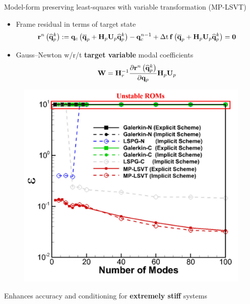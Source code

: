 \documentclass[]{beamer}
\begin{document}
\begin{frame}{\small{Model-form preserving least-squares with variable transformation (MP-LSVT)}}
	\begin{itemize}
		\item Frame residual in terms of target state\footnotemark[6]
		\begin{equation*}
			\resFuncIter{\timeIdx}{\primVecCoef^{\newtonIdx}} \defEq \consFunc{\primVecCent + \primScale \primTrial \primVecCoef^{\newtonIdx}} - \consVec^{\timeIdx-1} + \dt \, \rhsFunc{\primVecCent + \primScale \primTrial \primVecCoef^{\newtonIdx}} = \zeroVec
		\end{equation*}
		\item Gauss--Newton w/r/t \textbf{target variable} modal coefficients
		\begin{equation*}
			\testBasis = \resScaleInv \pde{\resFuncIter{\timeIdx}{\primVecCoef^{\newtonIdx}}}{\primVec} \primScale \primTrial
		\end{equation*}
	\end{itemize}
	\begin{minipage}{0.4\linewidth}
		\centering
		\begin{figure}
			\includegraphics[width=0.9\linewidth]{theory/mplsvt_err_vs_modes.png}
		\end{figure}
	\end{minipage}
	\begin{minipage}{0.58\linewidth}
		\begin{tcolorbox}[colframe=blue!50!white,halign=center]
			Enhances accuracy and conditioning for \textbf{extremely stiff} systems
		\end{tcolorbox}
	\end{minipage}
\end{frame}
\end{document}
